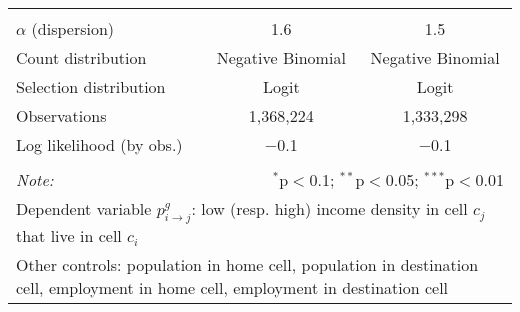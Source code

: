 \begin{table}[!htbp]
{\begin{tabular}{@{\extracolsep{5pt}}lcccc}
\hline \hline \\[-1.8ex]
$\alpha$ (dispersion) & \multicolumn{2}{c}{1.6} & \multicolumn{2}{c}{1.5} \\
Count distribution & \multicolumn{2}{c}{Negative Binomial} & \multicolumn{2}{c}{Negative Binomial} \\
Selection distribution & \multicolumn{2}{c}{Logit} & \multicolumn{2}{c}{Logit} \\
Observations & \multicolumn{2}{c}{1,368,224} & \multicolumn{2}{c}{1,333,298} \\
Log likelihood (by obs.) & \multicolumn{2}{c}{$-$0.1} & \multicolumn{2}{c}{$-$0.1} \\
\hline
\hline \\[-1.8ex]
\textit{Note:}  & \multicolumn{4}{r}{$^{*}$p$<$0.1; $^{**}$p$<$0.05; $^{***}$p$<$0.01} \\
 \multicolumn{5}{p{0.9\linewidth}}{\parbox[t]{\textwidth}{Dependent variable $p_{i \to j}^g$: low (resp. high) income density in cell $c_j$ that live in cell $c_i$}} \\
\multicolumn{5}{p{0.9\linewidth}}{\parbox[t]{\textwidth}{Other controls: population in home cell, population in destination cell, employment in home cell, employment in destination cell}}
\end{tabular}

}
\end{table}
